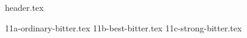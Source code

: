 \clearpage
{}
\divisorLine

{header.tex}

\begin{multicols}{2}

{11a-ordinary-bitter.tex}
{11b-best-bitter.tex}
{11c-strong-bitter.tex}

\end{multicols}